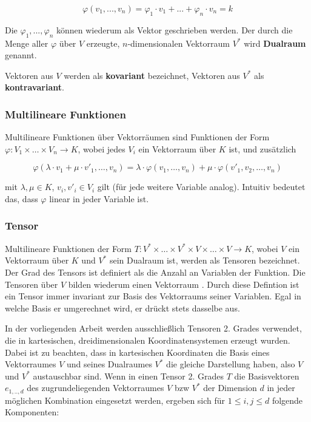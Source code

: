 \documentclass[a4paper,fontsize=12pt,toc=bib,halfparskip]{scrartcl}
\begin{document}
\begin{equation}
	\varphi(v_1, ..., v_n) = \varphi_1 \cdot v_1 + ... + \varphi_n \cdot v_n = k
\end{equation}

Die $\varphi_1, ..., \varphi_n$ k\"onnen wiederum als Vektor geschrieben werden. Der durch die Menge aller $\varphi$ \"uber $V$  erzeugte, $n$-dimensionalen Vektorraum $V^*$ wird \textbf{Dualraum} genannt\cite[S.~203]{bowen2008introduction}.

Vektoren aus $V$ werden als \textbf{kovariant} bezeichnet, Vektoren aus $V^*$ als \textbf{kontravariant}\cite[S.~205]{bowen2008introduction}.

\subsubsection{Multilineare Funktionen}
Multilineare Funktionen \"uber Vektorr\"aumen sind Funktionen der Form $\varphi: V_1 \times \dots \times V_n \rightarrow K$, wobei jedes $V_i$ ein Vektorraum \"uber $K$ ist, und zus\"atzlich 

\begin{equation}
	\varphi(\lambda \cdot v_1 + \mu \cdot v'_1, \dots, v_n) = \lambda \cdot \varphi(v_1, \dots, v_n) + \mu \cdot \varphi(v'_1, v_2, \dots, v_n)
\end{equation}

mit $\lambda, \mu \in K$, $v_i, v'_i \in V_i$ gilt (f\"ur jede weitere Variable analog). Intuitiv bedeutet das, dass $\varphi$ linear in jeder Variable ist\cite[S.~204, 218]{bowen2008introduction}.





\subsubsection{Tensor}
Multilineare Funktionen der Form $T: V^*\times\dots\times V^*\times V \times \dots \times V \rightarrow K$, wobei $V$ ein Vektorraum \"uber $K$ und $V^*$ sein Dualraum ist, werden als Tensoren bezeichnet\cite[S.~218]{bowen2008introduction}. Der Grad des Tensors ist definiert als die Anzahl an Variablen der Funktion. Die Tensoren \"uber $V$ bilden wiederum einen Vektorraum \cite[S.~220]{bowen2008introduction}. Durch diese Defintion ist ein Tensor immer invariant zur Basis des Vektorraums seiner Variablen. Egal in welche Basis er umgerechnet wird, er dr\"uckt stets dasselbe aus.

In der vorliegenden Arbeit werden ausschlie{\ss}lich Tensoren 2. Grades verwendet, die in kartesischen, dreidimensionalen Koordinatensystemen erzeugt wurden. Dabei ist zu beachten, dass in kartesischen Koordinaten die Basis eines Vektorraumes $V$ und seines Dualraumes $V^*$ die gleiche Darstellung haben, also $V$ und $V^*$ austauschbar sind. Wenn in einen Tensor 2. Grades $T$ die Basisvektoren $e_{1,..,d}$ des zugrundeliegenden Vektorraumes $V$ bzw $V^*$ der Dimension $d$ in jeder m\"oglichen Kombination eingesetzt werden, ergeben sich f\"ur $1\leq i,j\leq d$ folgende Komponenten:
\end{document}
